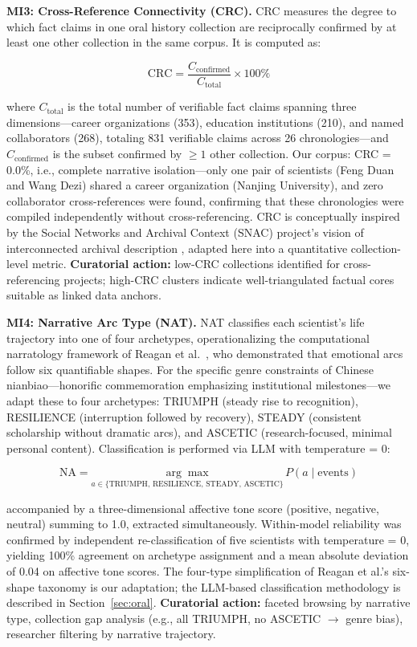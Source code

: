 \documentclass[review]{elsarticle}
\begin{document}
\textbf{MI3: Cross-Reference Connectivity (CRC).} CRC measures the degree to which fact claims in one oral history collection are reciprocally confirmed by at least one other collection in the same corpus. It is computed as:

\begin{equation}
\text{CRC} = \frac{C_{\text{confirmed}}}{C_{\text{total}}} \times 100\%
\end{equation}

where $C_{\text{total}}$ is the total number of verifiable fact claims spanning three dimensions---career organizations (353), education institutions (210), and named collaborators (268), totaling 831 verifiable claims across 26 chronologies---and $C_{\text{confirmed}}$ is the subset confirmed by $\geq 1$ other collection. Our corpus: CRC = 0.0\%, i.e., complete narrative isolation---only one pair of scientists (Feng Duan and Wang Dezi) shared a career organization (Nanjing University), and zero collaborator cross-references were found, confirming that these chronologies were compiled independently without cross-referencing. CRC is conceptually inspired by the Social Networks and Archival Context (SNAC) project's vision of interconnected archival description \cite{larson2015connecting}, adapted here into a quantitative collection-level metric. \textbf{Curatorial action:} low-CRC collections identified for cross-referencing projects; high-CRC clusters indicate well-triangulated factual cores suitable as linked data anchors.

\textbf{MI4: Narrative Arc Type (NAT).} NAT classifies each scientist's life trajectory into one of four archetypes, operationalizing the computational narratology framework of Reagan et al.\ \cite{reagan2016emotional}, who demonstrated that emotional arcs follow six quantifiable shapes. For the specific genre constraints of Chinese nianbiao---honorific commemoration emphasizing institutional milestones---we adapt these to four archetypes: TRIUMPH (steady rise to recognition), RESILIENCE (interruption followed by recovery), STEADY (consistent scholarship without dramatic arcs), and ASCETIC (research-focused, minimal personal content). Classification is performed via LLM with temperature = 0:

\begin{equation}
\text{NA} = \underset{a \in \{\text{TRIUMPH, RESILIENCE, STEADY, ASCETIC}\}}{\arg\max}\, P(a \mid \text{events})
\end{equation}

accompanied by a three-dimensional affective tone score (positive, negative, neutral) summing to 1.0, extracted simultaneously. Within-model reliability was confirmed by independent re-classification of five scientists with temperature = 0, yielding 100\% agreement on archetype assignment and a mean absolute deviation of 0.04 on affective tone scores. The four-type simplification of Reagan et al.'s six-shape taxonomy is our adaptation; the LLM-based classification methodology is described in Section~\ref{sec:oral}. \textbf{Curatorial action:} faceted browsing by narrative type, collection gap analysis (e.g., all TRIUMPH, no ASCETIC $\rightarrow$ genre bias), researcher filtering by narrative trajectory.
\end{document}
